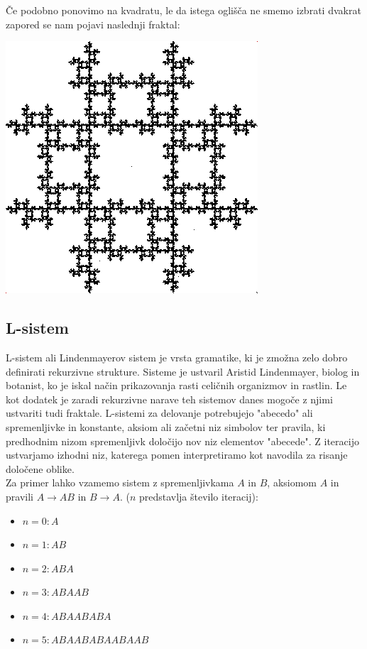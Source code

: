 \documentclass[a4paper, 12px]{article}
\begin{document}
        Če podobno ponovimo na kvadratu, le da istega oglišča ne smemo izbrati dvakrat zapored se nam pojavi naslednji fraktal:
        \centerline{\includegraphics[scale=0.6]{square-fractal.PNG}}
        \begingroup
        \endgroup
    
    \subsection{L-sistem}
        L-sistem ali Lindenmayerov sistem je vrsta gramatike, ki je zmožna zelo dobro definirati rekurzivne strukture.
        Sisteme je ustvaril Aristid Lindenmayer, biolog in botanist, ko je iskal način prikazovanja rasti celičnih organizmov in rastlin.
        Le kot dodatek je zaradi rekurzivne narave teh sistemov danes mogoče z njimi ustvariti tudi fraktale.
        L-sistemi za delovanje potrebujejo "abecedo" ali spremenljivke in konstante, aksiom ali začetni niz simbolov ter pravila, ki predhodnim nizom spremenljivk določijo nov niz elementov "abecede".
        Z iteracijo ustvarjamo izhodni niz, katerega pomen interpretiramo kot navodila za risanje določene oblike.
        \cite{LSystem}\\

        Za primer lahko vzamemo sistem z spremenljivkama $A$ in $B$, aksiomom $A$ in pravili $A \rightarrow AB$ in $B \rightarrow A$. ($n$ predstavlja število iteracij):
        \begin{itemize}
            \item[] $n=0: A$
            \item[] $n=1: AB$
            \item[] $n=2: ABA$
            \item[] $n=3: ABAAB$
            \item[] $n=4: ABAABABA$
            \item[] $n=5: ABAABABAABAAB$
        \end{itemize}
\end{document}
